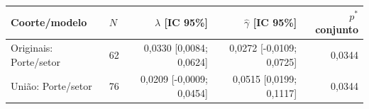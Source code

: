 \begin{tabular}{llrrr}
\toprule
Coorte/modelo & $N$ & $\widehat\lambda$ [IC 95\%] & $\widehat\gamma$ [IC 95\%] & $p^*$ conjunto\\
\midrule
Originais: Porte/setor & 62 & 0,0330 [0,0084; 0,0624] & 0,0272 [-0,0109; 0,0725] & 0,0344\\
União: Porte/setor & 76 & 0,0209 [-0,0009; 0,0454] & 0,0515 [0,0199; 0,1117] & 0,0344\\
\bottomrule
\end{tabular}
